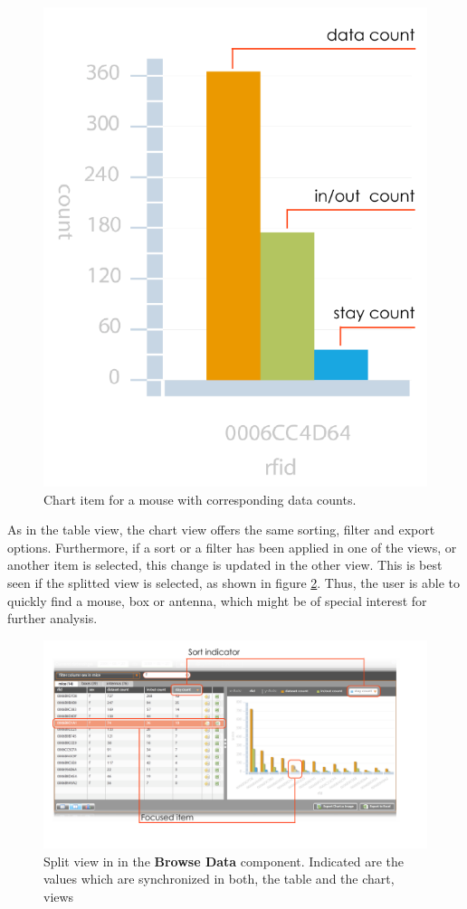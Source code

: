 \begin{figure}[htpb]
\begin{center}
  \includegraphics[width=.33\textwidth]{assets/pdf/mouse_chart_item.pdf}
  \caption[Chart item for a mouse with corresponding data counts]{Chart item for a mouse with corresponding data counts.}
  \label{fig:mouse_chart_item}
\end{center}
\end{figure}


As in the table view, the chart view offers the same sorting, filter and export options. Furthermore, if a sort or a filter has been applied in one of the views, or another item is selected, this change is updated in the other view. This is best seen if the splitted view is selected, as shown in figure \ref{fig:table_chart_view}. Thus, the user is able to quickly find a mouse, box or antenna, which might be of special interest for further analysis.

\begin{figure}[htpb]
\begin{center}
  \includegraphics[width=\textwidth]{assets/pdf/table_chart_view.pdf}
  \caption[Split view]{Split view in in the \textbf{Browse Data} component. Indicated are the values which are synchronized in both, the table and the chart, views}
  \label{fig:table_chart_view}
\end{center}
\end{figure}

